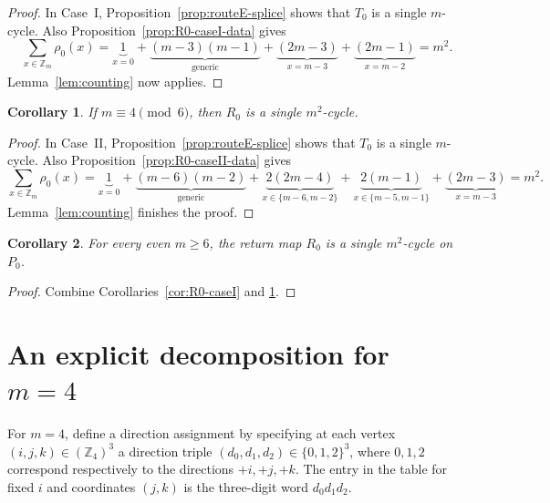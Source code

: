 \documentclass[11pt]{article}
\newtheorem{corollary}{Corollary}
\newcommand{\Zm}{\mathbb Z_m}
\begin{document}
\begin{proof}
In Case~I, Proposition~\ref{prop:routeE-splice} shows that $T_0$ is a single $m$-cycle.
Also Proposition~\ref{prop:R0-caseI-data} gives
\[
\sum_{x\in \Zm}\rho_0(x)=\underbrace{1}_{x=0}+\underbrace{(m-3)(m-1)}_{\text{generic}}+\underbrace{(2m-3)}_{x=m{-}3}+\underbrace{(2m-1)}_{x=m{-}2}=m^2.
\]
Lemma~\ref{lem:counting} now applies.
\end{proof}

\begin{corollary}\label{cor:R0-caseII}
If $m\equiv 4\pmod 6$, then $R_0$ is a single $m^2$-cycle.
\end{corollary}

\begin{proof}
In Case~II, Proposition~\ref{prop:routeE-splice} shows that $T_0$ is a single $m$-cycle.
Also Proposition~\ref{prop:R0-caseII-data} gives
\[
\sum_{x\in \Zm}\rho_0(x)=\underbrace{1}_{x=0}+\underbrace{(m-6)(m-2)}_{\text{generic}}+\underbrace{2(2m-4)}_{x\in\{m{-}6,m{-}2\}}+\underbrace{2(m-1)}_{x\in\{m{-}5,m{-}1\}}+\underbrace{(2m-3)}_{x=m{-}3}=m^2.
\]
Lemma~\ref{lem:counting} finishes the proof.
\end{proof}

\begin{corollary}\label{cor:R0-all}
For every even $m\ge 6$, the return map $R_0$ is a single $m^2$-cycle on $P_0$.
\end{corollary}

\begin{proof}
Combine Corollaries~\ref{cor:R0-caseI} and \ref{cor:R0-caseII}.
\end{proof}

\section{An explicit decomposition for $m=4$}\label{app:m4}

For $m=4$, define a direction assignment by specifying at each vertex $(i,j,k)\in(\mathbb Z_4)^3$ a direction triple $(d_0,d_1,d_2)\in\{0,1,2\}^3$, where $0,1,2$ correspond respectively to the directions $+i,+j,+k$.
The entry in the table for fixed $i$ and coordinates $(j,k)$ is the three-digit word $d_0d_1d_2$.
\end{document}
